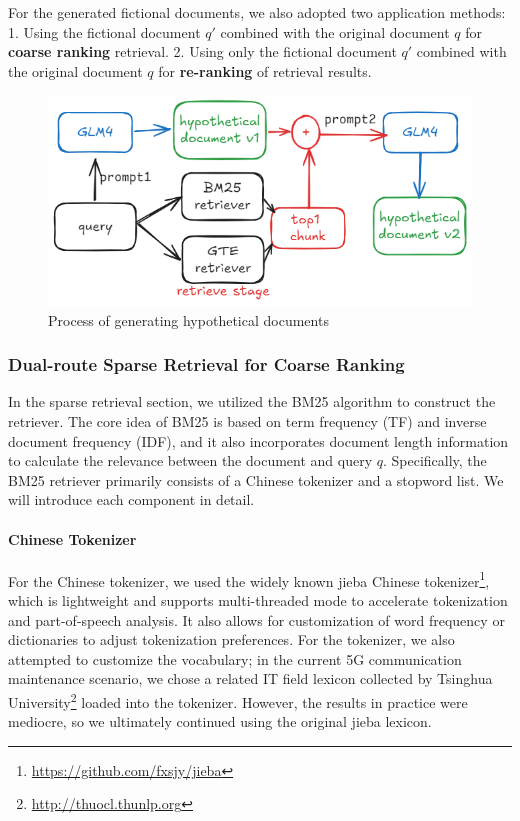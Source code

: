 \documentclass[11pt]{article}
\begin{document}
For the generated fictional documents, we also adopted two application methods: 1. Using the fictional document $q'$ combined with the original document $q$ for \textbf{coarse ranking} retrieval. 2. Using only the fictional document $q'$ combined with the original document $q$ for \textbf{re-ranking} of retrieval results.

\begin{figure}
    \centering
    \includegraphics[width=0.9\linewidth]{pics/rag-fig.png}
    \caption{Process of generating hypothetical documents}
    \label{fig:hyde}
\end{figure}

\subsubsection{Dual-route Sparse Retrieval for Coarse Ranking}
In the sparse retrieval section, we utilized the BM25 algorithm to construct the retriever. The core idea of BM25 is based on term frequency (TF) and inverse document frequency (IDF), and it also incorporates document length information to calculate the relevance between the document and query $q$. Specifically, the BM25 retriever primarily consists of a Chinese tokenizer and a stopword list. We will introduce each component in detail.

\paragraph{Chinese Tokenizer}
For the Chinese tokenizer, we used the widely known jieba Chinese tokenizer\footnote{\href{https://github.com/fxsjy/jieba}{https://github.com/fxsjy/jieba}}, which is lightweight and supports multi-threaded mode to accelerate tokenization and part-of-speech analysis. It also allows for customization of word frequency or dictionaries to adjust tokenization preferences. For the tokenizer, we also attempted to customize the vocabulary; in the current 5G communication maintenance scenario, we chose a related IT field lexicon collected by Tsinghua University\footnote{\href{http://thuocl.thunlp.org}{http://thuocl.thunlp.org}} loaded into the tokenizer. However, the results in practice were mediocre, so we ultimately continued using the original jieba lexicon.
\end{document}
